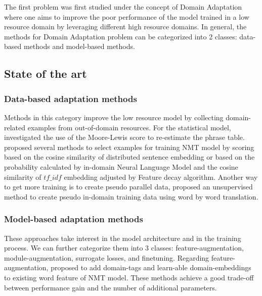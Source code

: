 \documentclass[12pt,a4paper,twoside]{report}
\theoremstyle{definition}
\begin{document}
The first problem was first studied under the concept of Domain Adaptation where one aims to improve the poor performance of the model trained in a low resource domain by leveraging different high resource domains. In general, the methods for Domain Adaptation problem can be categorized into 2 classes: data-based methods and model-based methods.

\subsection*{State of the art}

\subsubsection*{Data-based adaptation methods}
Methods in this category improve the low resource model by collecting domain-related examples from out-of-domain resources. For the statistical model, \citep{mansour12simple} investigated the use of the Moore-Lewis score to re-estimate the phrase table.\citep{Duh13selection,Axelrod11domain,silva2018extracting} proposed several methods to select examples for training NMT model by scoring based on the cosine similarity of distributed sentence embedding or based on the probability calculated by in-domain Neural Language Model and the cosine similarity of $tf\_idf$ embedding adjusted by Feature decay algorithm. Another way to get more training is to create pseudo parallel data, \cite{Junjie19domain} proposed an unsupervised method to create pseudo in-domain training data using word by word translation.

\subsubsection*{Model-based adaptation methods}
These approaches take interest in the model architecture and in the training process. We can further categorize them into 3 classes: feature-augmentation, module-augmentation, surrogate losses, and finetuning. Regarding feature-augmentation, \cite{Kobus17domain,kenji17multi,Pham19generic} proposed to add domain-tags and learn-able domain-embeddings to existing word feature of NMT model. These methods achieve a good trade-off between performance gain and the number of additional parameters.
\end{document}
